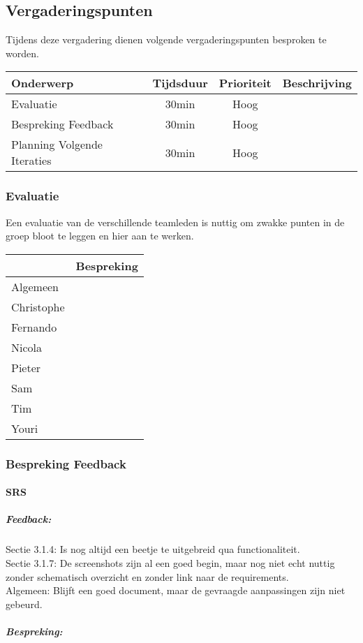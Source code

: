 \subsection{Vergaderingspunten} 
Tijdens deze vergadering dienen volgende vergaderingspunten besproken te worden.
\begin{table} [H]
	\centering
	\begin{tabular} {l|c|c|c}
		Onderwerp & Tijdsduur & Prioriteit & Beschrijving \\ %
		\hline
		Evaluatie & 30min & Hoog & \\
		Bespreking Feedback & 30min & Hoog & \\
		Planning Volgende Iteraties & 30min & Hoog & \\
		
	\end{tabular}
\end{table}

\subsubsection{Evaluatie}
Een evaluatie van de verschillende teamleden is nuttig om zwakke punten in de groep bloot te leggen en hier aan te werken.

\begin{table} [H]
	\centering
	\begin{tabular} {l|c}
		 & Bespreking \\
		\hline
		Algemeen & \\
		Christophe & \\
		Fernando & \\
		Nicola & \\				
		Pieter & \\
		Sam & \\		
		Tim & \\
		Youri & \\
	\end{tabular}
\end{table}

\subsubsection{Bespreking Feedback}
\paragraph{SRS}
\subparagraph{Feedback:}
Sectie 3.1.4: Is nog altijd een beetje te uitgebreid qua functionaliteit.
\\
Sectie 3.1.7: De screenshots zijn al een goed begin, maar nog niet echt nuttig zonder schematisch overzicht en zonder link naar de requirements.
\\
Algemeen: Blijft een goed document, maar de gevraagde aanpassingen zijn niet gebeurd.
\subparagraph{Bespreking:}

